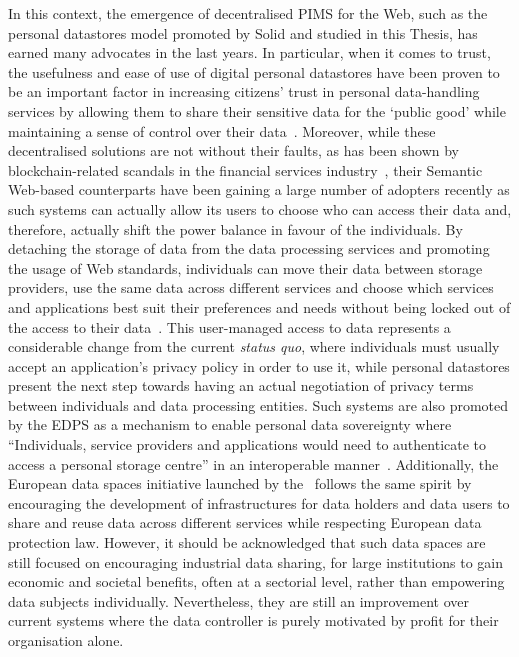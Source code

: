 In this context, the emergence of decentralised PIMS for the Web, such as the personal datastores model promoted by Solid and studied in this Thesis, has earned many advocates in the last years.
In particular, when it comes to trust, the usefulness and ease of use of digital personal datastores have been proven to be an important factor in increasing citizens' trust in personal data-handling services by allowing them to share their sensitive data for the `public good' while maintaining a sense of control over their data~\citep{mariani_explaining_2021}.
Moreover, while these decentralised solutions are not without their faults, as has been shown by blockchain-related scandals in the financial services industry~\citep{zetzsche_ico_2019}, their Semantic Web-based counterparts have been gaining a large number of adopters recently as such systems can actually allow its users to choose who can access their data and, therefore, actually shift the power balance in favour of the individuals.
By detaching the storage of data from the data processing services and promoting the usage of Web standards, individuals can move their data between storage providers, use the same data across different services and choose which services and applications best suit their preferences and needs without being locked out of the access to their data~\citep{verbrugge_towards_2021,ilves_roadmap_2019}.
This user-managed access to data represents a considerable change from the current \textit{status quo}, where individuals must usually accept an application's privacy policy in order to use it, while personal datastores present the next step towards having an actual negotiation of privacy terms between individuals and data processing entities.
Such systems are also promoted by the EDPS as a mechanism to enable personal data sovereignty where ``Individuals, service providers and applications would need to authenticate to access a personal storage centre'' in an interoperable manner~\citep{european_data_protection_supervisor_techdispatch_2021}.
Additionally, the European data spaces initiative launched by the~\cite{european_commission_communication_2020} follows the same spirit by encouraging the development of infrastructures for data holders and data users to share and reuse data across different services while respecting European data protection law.
However, it should be acknowledged that such data spaces are still focused on encouraging industrial data sharing, for large institutions to gain economic and societal benefits, often at a sectorial level, rather than empowering data subjects individually.
Nevertheless, they are still an improvement over current systems where the data controller is purely motivated by profit for their organisation alone.

